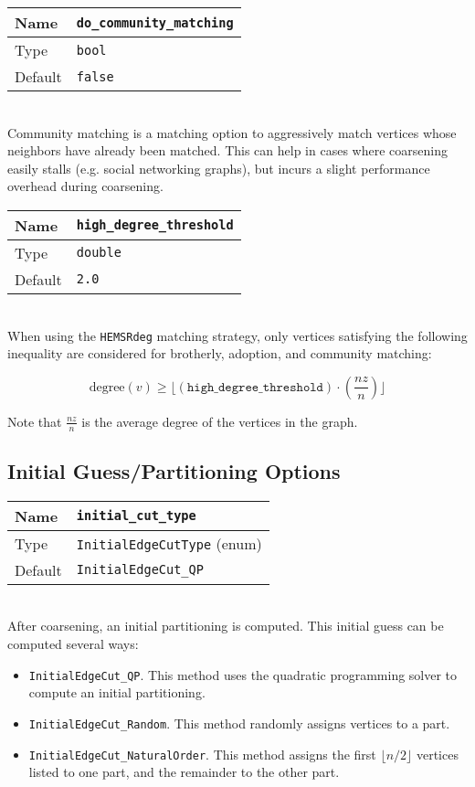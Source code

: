 \documentclass[letter]{article}
\begin{document}
\baselineskip
\begin{tabular}{|l|l|} \hline
Name & \texttt{do\_community\_matching} \\ \hline
Type & \texttt{bool} \\ \hline
Default & \texttt{false} \\ \hline
\end{tabular}\\

Community matching is a matching option to aggressively match vertices whose neighbors have already been matched. This can help in cases where coarsening easily stalls (e.g. social networking graphs), but incurs a slight performance overhead during coarsening.

\baselineskip
\begin{tabular}{|l|l|} \hline
Name & \texttt{high\_degree\_threshold} \\ \hline
Type & \texttt{double} \\ \hline
Default & \texttt{2.0} \\ \hline
\end{tabular}\\

When using the \texttt{HEMSRdeg} matching strategy, only vertices satisfying the following inequality are considered for brotherly, adoption, and community matching:

\[
\text{degree}(v) \geq \lfloor(\texttt{high\_degree\_threshold}) \cdot \left(\frac{nz}{n}\right)\rfloor
\]

Note that $\frac{nz}{n}$ is the average degree of the vertices in the graph.

\subsection{Initial Guess/Partitioning Options}

\begin{tabular}{|l|l|} \hline
Name & \texttt{initial\_cut\_type} \\ \hline
Type & \texttt{InitialEdgeCutType} (enum) \\ \hline
Default & \texttt{InitialEdgeCut\_QP} \\ \hline
\end{tabular}\\

After coarsening, an initial partitioning is computed. This initial guess can be computed several ways:

\begin{itemize}
\item \texttt{InitialEdgeCut\_QP}. This method uses the quadratic programming solver to compute an initial partitioning.
\item \texttt{InitialEdgeCut\_Random}. This method randomly assigns vertices to a part.
\item \texttt{InitialEdgeCut\_NaturalOrder}. This method assigns the first $\lfloor n/2 \rfloor$ vertices listed to one part, and the remainder to the other part.
\end{itemize}
\end{document}
